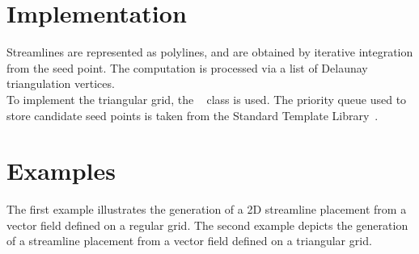 \section{Implementation}
\label{Section_2D_Streamlines_Implementation}
Streamlines are represented as polylines, and are obtained by iterative
integration from the seed point. The computation is processed via a list of
Delaunay triangulation vertices.\\To implement the triangular grid, the \cgal\
 class is used. The priority queue used to store
candidate seed
points is taken from the Standard Template Library~\cite{cgal:sgcsi-stlpg-97}.

\section{Examples}
\label{Section_2D_Streamlines_Example}
The first example illustrates the generation of a 2D streamline placement from a 
vector field defined on a regular grid.
The second example depicts the generation of a streamline placement from a vector
field defined on a triangular grid.
